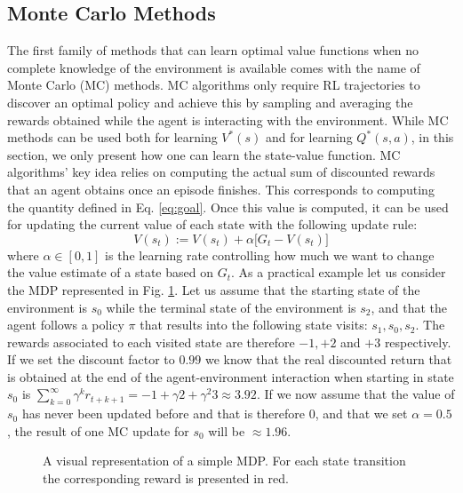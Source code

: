 \subsection{Monte Carlo Methods}
The first family of methods that can learn optimal value functions when no complete knowledge of the environment is available comes with the name of Monte Carlo (MC) methods. MC algorithms only require RL trajectories to discover an optimal policy and achieve this by sampling and averaging the rewards obtained while the agent is interacting with the environment. While MC methods can be used both for learning $V^{*}(s)$ and for learning $Q^{*}(s,a)$, in this section, we only present how one can learn the state-value function. MC algorithms' key idea relies on computing the actual sum of discounted rewards that an agent obtains once an episode finishes. This corresponds to computing the quantity defined in Eq. \ref{eq:goal}. Once this value is computed, it can be used for updating the current value of each state with the following update rule: 
\begin{equation}
	V(s_t) := V(s_t) + \alpha \big[G_t - V(s_t) \big]
\label{eq:mc_update}
\end{equation}
where $\alpha \in [0,1]$ is the learning rate controlling how much we want to change the value estimate of a state based on $G_t$. As a practical example let us consider the MDP represented in Fig. \ref{fig:mdp}. Let us assume that the starting state of the environment is $s_0$ while the terminal state of the environment is $s_2$, and that the agent follows a policy $\pi$ that results into the following state visits: $s_1, s_0, s_2$. The rewards associated to each visited state are therefore $-1, +2$ and $+3$ respectively. If we set the discount factor to $0.99$ we know that the real discounted return that is obtained at the end of the agent-environment interaction when starting in state $s_0$ is $\sum_{k=0}^{\infty}\gamma^{k} r_{t+k+1} = -1+\gamma2+\gamma^{2}3 \approx 3.92$. If we now assume that the value of $s_0$ has never been updated before and that is therefore $0$, and that we set $\alpha=0.5$, the result of one MC update for $s_0$ will be $\approx 1.96$. 

\begin{figure}[ht!]
	\centering
	
\caption{A visual representation of a simple MDP. For each state transition the corresponding reward is presented in red.}
\label{fig:mdp}
\end{figure}

